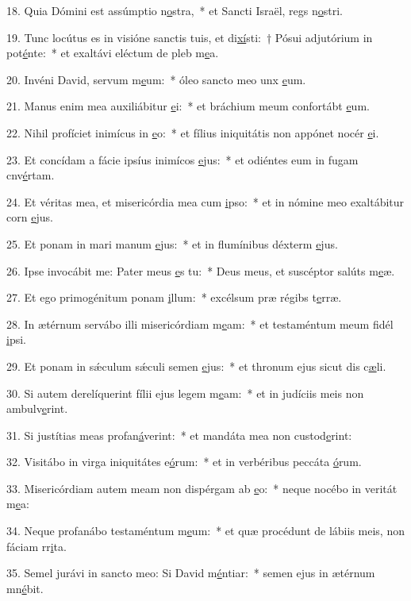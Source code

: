 18. Quia Dómini est assúmptio n\uline{o}stra,~* et Sancti Israël, regs n\uline{o}stri.\par 
19. Tunc locútus es in visióne sanctis tuis, et di\uline{xí}sti:~† Pósui adjutórium in pot\uline{é}nte:~* et exaltávi eléctum de pleb m\uline{e}a.\par 
20. Invéni David, servum m\uline{e}um:~* óleo sancto meo unx \uline{e}um.\par 
21. Manus enim mea auxiliábitur \uline{e}i:~* et bráchium meum confortábt \uline{e}um.\par 
22. Nihil profíciet inimícus in \uline{e}o:~* et fílius iniquitátis non appónet nocér \uline{e}i.\par 
23. Et concídam a fácie ipsíus inimícos \uline{e}jus:~* et odiéntes eum in fugam cnv\uline{é}rtam.\par 
24. Et véritas mea, et misericórdia mea cum \uline{i}pso:~* et in nómine meo exaltábitur corn \uline{e}jus.\par 
25. Et ponam in mari manum \uline{e}jus:~* et in flumínibus déxterm \uline{e}jus.\par 
26. Ipse invocábit me: Pater meus \uline{e}s tu:~* Deus meus, et suscéptor salúts m\uline{e}æ.\par 
27. Et ego primogénitum ponam \uline{i}llum:~* excélsum præ régibs t\uline{e}rræ.\par 
28. In ætérnum servábo illi misericórdiam m\uline{e}am:~* et testaméntum meum fidél \uline{i}psi.\par 
29. Et ponam in sǽculum sǽculi semen \uline{e}jus:~* et thronum ejus sicut dis c\uline{æ}li.\par 
30. Si autem derelíquerint fílii ejus legem m\uline{e}am:~* et in judíciis meis non ambulv\uline{e}rint.\par 
31. Si justítias meas profan\uline{á}verint:~* et mandáta mea non custod\uline{e}rint:\par 
32. Visitábo in virga iniquitátes e\uline{ó}rum:~* et in verbéribus peccáta \uline{ó}rum.\par 
33. Misericórdiam autem meam non dispérgam ab \uline{e}o:~* neque nocébo in veritát m\uline{e}a:\par 
34. Neque profanábo testaméntum m\uline{e}um:~* et quæ procédunt de lábiis meis, non fáciam rr\uline{i}ta.\par 
35. Semel jurávi in sancto meo: Si David m\uline{é}ntiar:~* semen ejus in ætérnum mn\uline{é}bit.\par 
